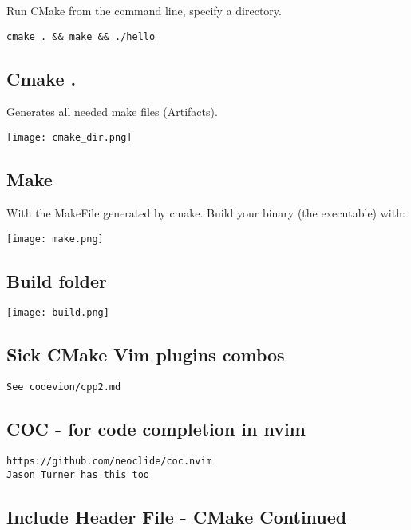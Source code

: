 \documentclass[openany]{report}
\begin{document}
Run CMake from the command line, specify a directory.
\begin{verbatim}
cmake . && make && ./hello
\end{verbatim}

\subsection{Cmake .  }

Generates all needed make files (Artifacts).

\begin{center}
    \texttt{[image: cmake\_dir.png]}
\end{center}

\subsection{Make}

With the MakeFile generated by cmake. Build your binary (the executable) with:

\begin{center}
    \texttt{[image: make.png]}
\end{center}

\subsection{Build folder}

\begin{center}
    \texttt{[image: build.png]}
\end{center}

\subsection{Sick CMake Vim plugins combos}

\begin{verbatim}
See codevion/cpp2.md
\end{verbatim}

\subsection{COC - for code completion in nvim}
\begin{verbatim}
https://github.com/neoclide/coc.nvim
Jason Turner has this too
\end{verbatim}

\subsection{Include Header File - CMake Continued}
\end{document}
